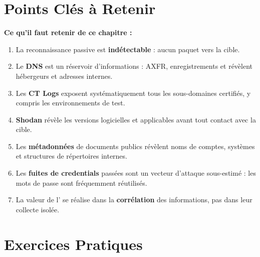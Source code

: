 \section*{Points Clés à Retenir}

\begin{boxinfo}
\textbf{Ce qu'il faut retenir de ce chapitre :}
\begin{enumerate}
    \item La reconnaissance passive est \textbf{indétectable} : aucun paquet
          vers la cible.
    \item Le \textbf{DNS} est un réservoir d'informations : AXFR, enregistrements
           et  révèlent hébergeurs et adresses internes.
    \item Les \textbf{CT Logs} exposent systématiquement tous les sous-domaines
          certifiés, y compris les environnements de test.
    \item \textbf{Shodan} révèle les versions logicielles et 
          applicables avant tout contact avec la cible.
    \item Les \textbf{métadonnées} de documents publics révèlent noms de comptes,
          systèmes et structures de répertoires internes.
    \item Les \textbf{fuites de credentials} passées sont un vecteur d'attaque
          sous-estimé : les mots de passe sont fréquemment réutilisés.
    \item La valeur de l' se réalise dans la \textbf{corrélation}
          des informations, pas dans leur collecte isolée.
\end{enumerate}
\end{boxinfo}

\section*{Exercices Pratiques}


